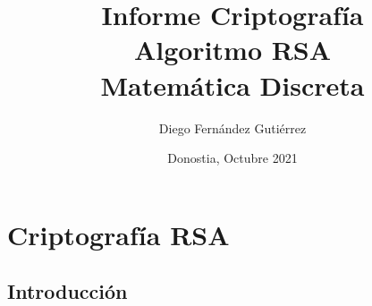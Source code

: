 \documentclass[12pt,a4paper]{book}
\title{\Huge \textbf{Informe Criptografía}\\ \textbf{Algoritmo RSA}\\ \vspace{0.5cm} \LARGE Matemática Discreta}
\author{Diego Fernández Gutiérrez}
\date{Donostia, Octubre 2021}
\renewcommand{\thepage}{\roman{page}}
\theoremstyle{change}
\begin{document}
	\maketitle
	
	
	\setcounter{page}{1}
	
	\renewcommand{\thepage}{\arabic{page}}
	
	\tableofcontents
	
	
	\printindex
	
	\setcounter{page}{2}
	
	\chapter{Criptografía RSA}
	\section{Introducción}
	
\end{document}
